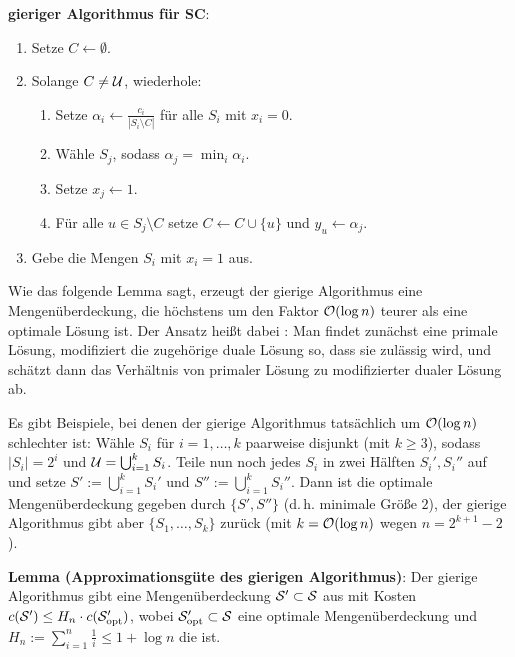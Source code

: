\textbf{gieriger Algorithmus für SC}:
\begin{enumerate}
    \item
    Setze $C \leftarrow \emptyset$.

    \item
    Solange $C \not= \U$, wiederhole:
    \begin{enumerate}
        \item
        Setze $\alpha_i \leftarrow \frac{c_i}{|S_i \setminus C|}$
        für alle $S_i$ mit $x_i = 0$.

        \item
        Wähle $S_j$, sodass $\alpha_j = \min_i \alpha_i$.

        \item
        Setze $x_j \leftarrow 1$.

        \item
        Für alle $u \in S_j \setminus C$ setze $C \leftarrow C \cup \{u\}$ und
        $y_u \leftarrow \alpha_j$.
    \end{enumerate}

    \item
    Gebe die Mengen $S_i$ mit $x_i = 1$ aus.
\end{enumerate}

Wie das folgende Lemma sagt, erzeugt der gierige Algorithmus eine
Mengenüberdeckung, die höchstens um den Faktor $\O(\log n)$ teurer als
eine optimale Lösung ist.
Der Ansatz heißt dabei :
Man findet zunächst eine primale Lösung,
modifiziert die zugehörige duale Lösung so, dass sie zulässig wird,
und schätzt dann das Verhältnis von primaler Lösung zu modifizierter dualer Lösung ab.

Es gibt Beispiele, bei denen der gierige Algorithmus tatsächlich um $\O(\log n)$
schlechter ist:
Wähle $S_i$ für $i = 1, \dotsc, k$ paarweise disjunkt (mit $k \ge 3$), sodass $|S_i| = 2^i$
und $\U = \bigcup_{i=1}^k S_i$.
Teile nun noch jedes $S_i$ in zwei Hälften $S_i', S_i''$ auf und setze
$S' := \bigcup_{i=1}^k S_i'$ und $S'' := \bigcup_{i=1}^k S_i''$.
Dann ist die optimale Mengenüberdeckung gegeben durch $\{S', S''\}$
(d.\,h. minimale Größe $2$),
der gierige Algorithmus gibt aber $\{S_1, \dotsc, S_k\}$ zurück
(mit $k = \O(\log n)$ wegen $n = 2^{k+1} - 2$).

\linie

\textbf{Lemma (Approximationsgüte des gierigen Algorithmus)}:
Der gierige Algorithmus gibt eine Mengenüberdeckung $\S' \subset \S$ aus mit
Kosten $c(\S') \le H_n \cdot c(\S_\opt')$,
wobei $\S_\opt' \subset \S$ eine optimale Mengenüberdeckung und
$H_n := \sum_{i=1}^n \frac{1}{i} \le 1 + \log n$
die  ist.

